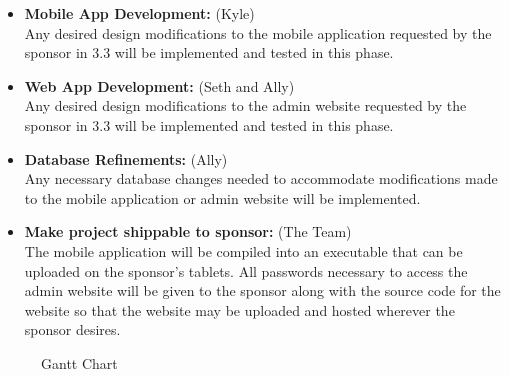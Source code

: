 \documentclass[Letter,11pt]{article}
\begin{document}
		\begin{itemize}
			\item\textbf{Mobile App Development:} (Kyle)\\
			Any desired design modifications to the mobile application requested by the sponsor in 3.3 will be implemented and tested in this phase. \\
			\item \textbf{Web App Development:} (Seth and Ally)\\
			Any desired design modifications to the admin website requested by the sponsor in 3.3 will be implemented and tested in this phase. \\
			
			\item\textbf{Database Refinements:} (Ally)\\
			Any necessary database changes needed to accommodate modifications made to the mobile application or admin website will be implemented. \\
			
			\item\textbf{Make project shippable to sponsor:} (The Team)\\
			The mobile application will be compiled into an executable that can be uploaded on the sponsor’s tablets.  All passwords necessary to access the admin website will be given to the sponsor along with the source code for the website so that the website may be uploaded and hosted wherever the sponsor desires. 

			
		\end{itemize}
		
		\begin{landscape}
			\begin{figure}
				
				\caption{\label{fig:gant}Gantt Chart}
			\end{figure}
		\end{landscape}
	
\end{document}
